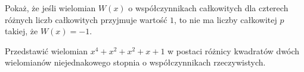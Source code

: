 \documentclass{article}
\begin{document}
\begin{zadanie}
  Pokaż, że jeśli wielomian $W(x)$ o współczynnikach całkowitych dla czterech różnych liczb całkowitych przyjmuje wartość $1$, to nie ma liczby całkowitej $p$ takiej, że $W(x)=-1$.
\end{zadanie}

\begin{zadanie}
  Przedstawić wielomian $x^4+x^2+x^2+x+1$ w postaci różnicy kwadratów dwóch wielomianów niejednakowego stopnia o współczynnikach rzeczywistych.
\end{zadanie}

\end{document}
